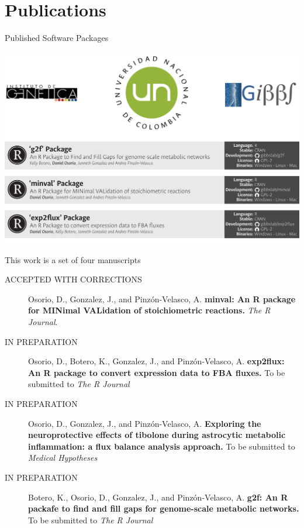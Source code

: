 \documentclass[11pt]{beamer}
\begin{document}
\section{Publications}
\begin{frame}{Published Software Packages}
\begin{center}
\includegraphics[width=\textwidth]{SPackages}
\end{center}
\end{frame}
\begin{frame}{This work is a set of four manuscripts}
\begin{footnotesize}
\begin{description}
\item[ACCEPTED WITH CORRECTIONS] Osorio, D., Gonzalez, J., and Pinzón-Velasco, A. \textbf{minval: An R package for MINimal VALidation of stoichiometric reactions.} \textit{The R Journal}.
\item[IN PREPARATION] Osorio, D., Botero, K., Gonzalez, J., and Pinzón-Velasco, A. \textbf{exp2flux: An R package to convert expression data to FBA fluxes.} To be submitted to \textit{The R Journal}
\item[IN PREPARATION] Osorio, D., Gonzalez, J., and Pinzón-Velasco, A.\textbf{ Exploring the neuroprotective effects of tibolone during astrocytic metabolic inflammation: a flux balance analysis approach.} To be submitted to \textit{Medical Hypotheses}
\item[IN PREPARATION] Botero, K., Osorio, D., Gonzalez, J., and Pinzón-Velasco, A. \textbf{g2f: An R packafe to find and fill gaps for genome-scale metabolic networks.} To be submitted to \textit{The R Journal}
\end{description}
\end{footnotesize}
\end{frame}
\end{document}
